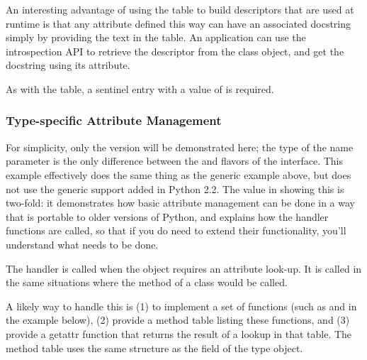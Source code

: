 An interesting advantage of using the  table to
build descriptors that are used at runtime is that any attribute
defined this way can have an associated docstring simply by providing
the text in the table.  An application can use the introspection API
to retrieve the descriptor from the class object, and get the
docstring using its  attribute.

As with the  table, a sentinel entry with a
 value of \NULL{} is required.  


%


\subsubsection{Type-specific Attribute Management}

For simplicity, only the  version will be demonstrated
here; the type of the name parameter is the only difference between
the  and  flavors of the interface.
This example effectively does the same thing as the generic example
above, but does not use the generic support added in Python 2.2.  The
value in showing this is two-fold: it demonstrates how basic attribute
management can be done in a way that is portable to older versions of
Python, and explains how the handler functions are called, so that if
you do need to extend their functionality, you'll understand what
needs to be done.

The  handler is called when the object requires an
attribute look-up.  It is called in the same situations where the
 method of a class would be called.

A likely way to handle this is (1) to implement a set of functions
(such as  and
 in the example below), (2) provide a
method table listing these functions, and (3) provide a getattr
function that returns the result of a lookup in that table.  The
method table uses the same structure as the  field
of the type object.

